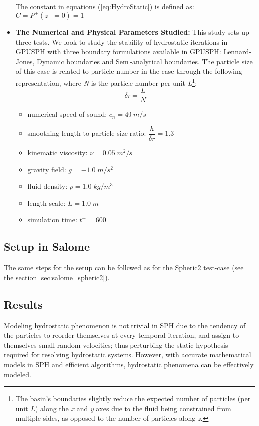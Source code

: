 \documentclass{../GPUSPHtemplate}
\begin{document}
\begin{itemize}
  The constant in equations (\ref{eq:HydroStatic}) is defined as:\\
  $C = P^+(z^+ = 0) = 1$
  
\item \textbf{The Numerical and Physical Parameters Studied:} This study sets up three tests.
  We look to study the stability of hydrostatic iterations in GPUSPH with three boundary formulations available in GPUSPH:
  Lennard-Jones, Dynamic boundaries and Semi-analytical boundaries.
  The particle size of this case is related to particle number in the case through the following representation,
  where \textit{N} is the particle number per unit
  \textit{L}\footnote{The basin's boundaries slightly reduce the expected number of particles (per unit $L$)
    along the \textit{x} and \textit{y} axes due to the fluid being constrained from multiple sides,
    as opposed to the number of particles along \textit{z}. }:
  \begin{equation}
    \delta r = \frac{L}{N} 
  \end{equation}            
  
  \begin{itemize}
  \item numerical speed of sound: ${c_n} = 40 \; m/s$
  \item smoothing length to particle size ratio: $\dfrac{h}{\delta r}=1.3$ 
  \item kinematic viscosity: $\nu = 0.05 \; {m^2}/{s}$
  \item gravity field: $g = -1.0 \; {m}/{s^2}$
  \item fluid density: $\rho = 1.0 \; {kg}/{m^3} $
  \item length scale: $L = 1.0 \; m$
  \item simulation time: $t^+ = 600 $ 
  \end{itemize}
\end{itemize}

\subsection{Setup in Salome}

The same steps for the setup can be followed as for the Spheric2 test-case (see the section \ref{sec:salome_spheric2}).

\subsection{Results}
Modeling hydrostatic phenomenon is not trivial in SPH due to the tendency of the particles
to reorder themselves at every temporal iteration, and assign to themselves small random velocities;
thus perturbing the static hypothesis required for resolving hydrostatic systems. However, with accurate
mathematical models in SPH and efficient algorithms, hydrostatic phenomena can be effectively modeled.\\
\end{document}
